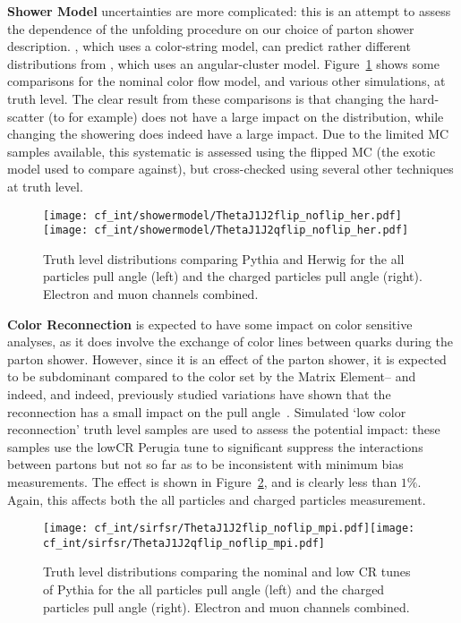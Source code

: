   \textbf{Shower Model} uncertainties are more complicated: this is an attempt to assess the dependence of the unfolding procedure on our choice of parton shower description. \Pythia, which uses a color-string model, can predict rather different distributions from \Herwig, which uses an angular-cluster model. Figure~\ref{fig:color:uncertainties:theory:shower} shows some comparisons for the nominal color flow model, and various other simulations, at truth level. The clear result from these comparisons is that changing the hard-scatter (\Powheg to \Mcatnlo for example) does not have a large impact on the distribution, while changing the showering does indeed have a large impact. Due to the limited MC samples available, this systematic is assessed using the flipped MC (the exotic model used to compare against), but cross-checked using several other techniques at truth level.

\begin{figure}[h!]
\begin{center}
\texttt{[image: cf\_int/showermodel/ThetaJ1J2flip\_noflip\_her.pdf]}\texttt{[image: cf\_int/showermodel/ThetaJ1J2qflip\_noflip\_her.pdf]}
\caption{Truth level distributions comparing Pythia and Herwig for the all particles pull angle (left) and the charged particles pull angle (right).  Electron and muon channels combined.}
\label{fig:color:uncertainties:theory:shower}
\end{center}
\end{figure}

	\textbf{Color Reconnection} is expected to have some impact on color sensitive analyses, as it does involve the exchange of color lines between quarks during the parton shower. However, since it is an effect of the parton shower, it is expected to be subdominant compared to the color set by the Matrix Element-- and indeed, and indeed, previously studied variations have shown that the reconnection has a small impact on the pull angle~\cite{Altheimer:2013yza}. Simulated `low color reconnection' truth level samples are used to assess the potential impact: these samples use the lowCR Perugia tune to significant suppress the interactions between partons but not so far as to be inconsistent with minimum bias measurements. The effect is shown in Figure~\ref{fig:color:uncertainties:theory:cr}, and is clearly less than $1\%$. Again, this affects both the all particles and charged particles measurement.


\begin{figure}[h!]
\begin{center}
\texttt{[image: cf\_int/sirfsr/ThetaJ1J2flip\_noflip\_mpi.pdf]}\texttt{[image: cf\_int/sirfsr/ThetaJ1J2qflip\_noflip\_mpi.pdf]}
\caption{Truth level distributions comparing the nominal and low CR tunes of Pythia for the all particles pull angle (left) and the charged particles pull angle (right).  Electron and muon channels combined.}
\label{fig:color:uncertainties:theory:cr}
\end{center}
\end{figure}


